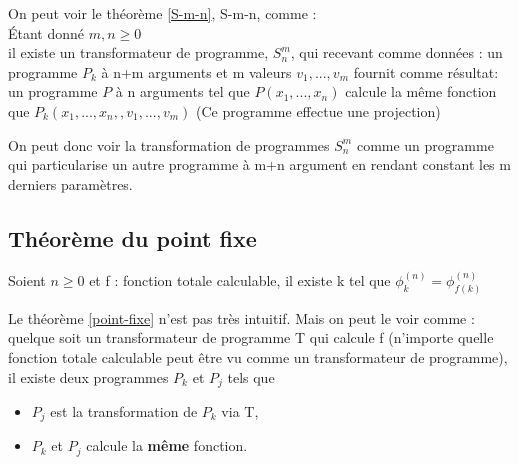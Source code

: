 \begin{myrem}
	On peut voir le théorème \ref{S-m-n}, S-m-n, comme : \\
	Étant donné $m,n \geq 0$\\
	il existe un transformateur de programme, $S^m_n$, qui recevant comme 
	données : un programme $P_k$ à n+m arguments et m valeurs $v_1,...,v_m$
	fournit comme résultat: un programme $P$ à n arguments tel que 
	$P(x_1,...,x_n)$ calcule la même fonction que 
	$P_k(x_1,...,x_n,,v_1,...,v_m)$ (Ce programme effectue une projection)
\end{myrem}

\begin{myrem}
	On peut donc voir la transformation de programmes $S^m_n$ comme un 
	programme qui particularise un autre programme à m+n argument en rendant 
	constant les m derniers paramètres.
\end{myrem}

\subsection{Théorème du point fixe}
\label{sub:th_or_me_du_point_fixe}
\begin{mytheo} 
	\label{point-fixe}Soient $n \geq 0$ et f : fonction totale 
	calculable, il existe k tel que $\phi^{(n)}_k = \phi^{(n)}_{f(k)}$  
\end{mytheo}

\begin{myrem}
	Le théorème \ref{point-fixe} n'est pas très intuitif. Mais on peut le 
	voir comme : quelque soit un transformateur de programme T qui calcule f 
	(n'importe quelle fonction totale calculable peut être vu comme un transformateur 
	de programme), \\
	il existe deux programmes $P_k$ et $P_j$ tels que 
	\begin{itemize}
		\item $P_j$ est la transformation de $P_k$ via T,
		\item $P_k$ et $P_j$ calcule la \textbf{même} fonction.
	\end{itemize}
\end{myrem}

